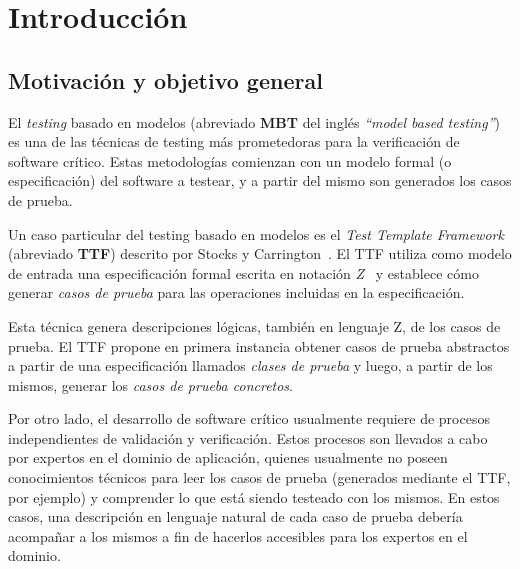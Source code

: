 \chapter{Introducción}
\label{introduccion}

\section{Motivación y objetivo general}
El \textit{testing} basado en modelos (abreviado \textbf{MBT} del inglés \emph{``model based testing''}) es una de las técnicas de testing más prometedoras para la verificación de software crítico. Estas metodologías comienzan con un modelo formal (o especificación) del software a testear, y a partir del mismo son generados los casos de prueba.

Un caso particular del testing basado en modelos es el \emph{Test Template Framework} (abreviado \textbf{TTF}) descrito por Stocks y Carrington~\cite{stocks}. El TTF utiliza como modelo de entrada una especificación formal escrita en notación \emph{Z}~\cite{spivey} y establece cómo generar \emph{casos de prueba} para las operaciones incluidas en la especificación. 

Esta técnica genera descripciones lógicas, también en lenguaje Z, de los casos de prueba. El TTF propone en primera instancia obtener casos de prueba abstractos a partir de una especificación llamados \emph{clases de prueba} y luego, a partir de los mismos, generar los \emph{casos de prueba concretos}.

Por otro lado, el desarrollo de software crítico usualmente requiere de procesos independientes de validación y verificación. Estos procesos son llevados a cabo por expertos en el dominio de aplicación, quienes usualmente no poseen conocimientos técnicos para leer los casos de prueba (generados mediante el TTF, por ejemplo) y comprender lo que está siendo testeado con los mismos. En estos casos, una descripción en lenguaje natural de cada caso de prueba debería acompañar a los mismos a fin de hacerlos accesibles para los expertos en el dominio.  

